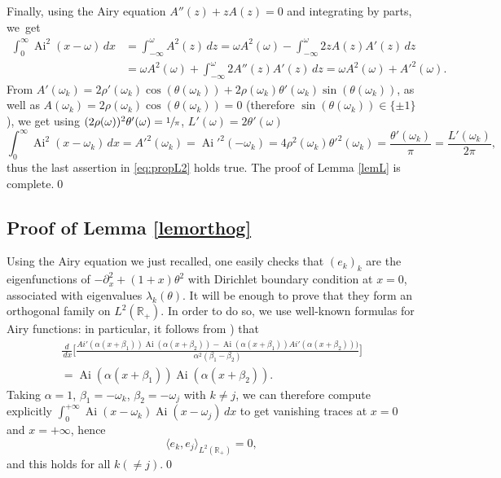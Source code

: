\documentclass[JEP,XML,SOM,Unicode,NoEqCountersInSection,NoFloatCountersInSection,published]{cedram}
\DeclareMathOperator{\Ai}{Ai}
\theoremstyle{plain}
\theoremstyle{definition}
\begin{document}
Finally, using the Airy equation $A''(z)+z A(z)=0$ and integrating by parts, we~get\vspace*{-3pt}
\begin{align*}
\int_{0}^{\infty}\Ai^2(x-\omega)\,dx&=\int_{-\infty}^{\omega}A^2(z)\,dz  =\omega A^2(\omega)-\int_{-\infty}^{\omega}2zA(z)A'(z)\,dz\\[
-3pt]
& =\omega A^2(\omega)+\int_{-\infty}^{\omega}2A''(z)A'(z)\,dz =\omega A^2(\omega)+A'^2(\omega).
\end{align*}
From $A'(\omega_k)=2\rho'(\omega_k)\cos(\theta(\omega_k))+2\rho(\omega_k)\theta'(\omega_k)\sin(\theta(\omega_k))$, as well as $A(\omega_k)=2\rho(\omega_k)\cos(\theta(\omega_k))=0$ (therefore $\sin(\theta(\omega_k))\in \{\pm1\}$), we get using $(2\rho(\omega))^2\theta'(\omega)=\sfrac{1}{\pi}$, $L'(\omega)=2\theta'(\omega)$\vspace*{-3pt}
\[
\int_0^{\infty}\Ai^2(x-\omega_k)\,dx=A'^2(\omega_k)=\Ai'^2(-\omega_k)=4\rho^2(\omega_k)\theta'^2(\omega_k)=\frac{\theta'(\omega_k)}{\pi}=\frac{L'(\omega_k)}{2\pi},
\]
thus the last assertion in \eqref{eq:propL2} holds true. The proof of Lemma \ref{lemL} is complete.\qed
\subsection{Proof of Lemma \ref{lemorthog}}
Using the Airy equation we just recalled, one easily checks that $(e_k)_{k}$ are the eigenfunctions of $-\partial^2_x+(1+x)\theta^2$ with Dirichlet boundary condition at $x=0$, associated with eigenvalues $\lambda_k(\theta)$. It will be enough to prove that they form an orthogonal family on $L^2(\mathbb{R}_+)$. In order to do so, we use well-known formulas for Airy functions: in particular, it follows from \cite[(3.53)]{AFbook}) that\vspace*{-3pt}
\begin{multline*}
\frac{d}{\,dx} \Big[\frac{Ai'(\alpha(x+\beta_1))\Ai(\alpha(x+\beta_2))-\Ai(\alpha(x+\beta_1))Ai'(\alpha(x+\beta_2)))} {\alpha^2(\beta_1-\beta_2)}\Big]\\ = \Ai(\alpha(x+\beta_1))\Ai(\alpha(x+\beta_2)).
\end{multline*}
Taking $\alpha=1$, $\beta_1=-\omega_k$, $\beta_2=-\omega_j$ with $k\neq j$, we can therefore compute explicitly $\int_{0}^{+\infty} \Ai(x-\omega_{k})\Ai(x-\omega_{j})\,dx$ to get vanishing traces at $x=0$ and $x=+\infty$, hence\vspace*{-3pt}
\[
\langle e_k,e_j \rangle_{L^2(\mathbb{R}_+)}=0,
\]
and this holds for all $k(\neq j)$.\qed
\end{document}
